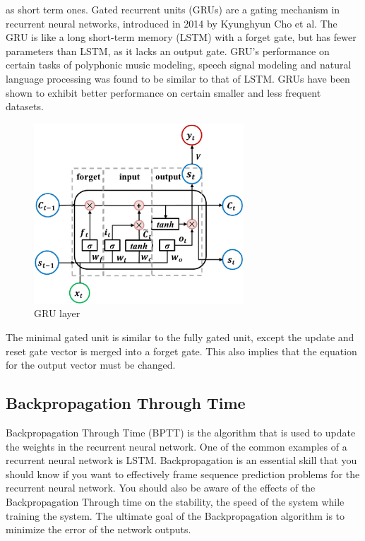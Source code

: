 as short term ones.
Gated recurrent units (GRUs) are a gating mechanism in recurrent neural networks,
introduced in 2014 by Kyunghyun Cho et al.
The GRU is like a long short-term memory (LSTM) with a forget gate, but has fewer parameters 
than LSTM, as it lacks an output gate. GRU's performance on certain tasks of polyphonic music
modeling, speech signal modeling and natural language processing was found to be similar 
to that of LSTM. GRUs have been shown to exhibit better performance on certain smaller and less
frequent datasets.
\begin{figure}[htb] 
	\label{fig:gru}
	\includegraphics[width=0.7\textwidth]{figures/gru}
	\caption{GRU layer}
\end{figure}
The minimal gated unit is similar to the fully gated unit, except the update and reset gate vector
is merged into a forget gate. This also implies that the equation for the output vector 
must be changed.

\subsection{Backpropagation Through Time}
Backpropagation Through Time (BPTT) is the algorithm that is used to update the weights in the 
recurrent neural network. 
One of the common examples of a recurrent neural network is LSTM. 
Backpropagation is an essential skill that you should know if you want to effectively frame 
sequence prediction problems for the recurrent neural network. You should also be aware of the
effects of the Backpropagation Through time on the stability, the speed of the system while 
training the system.
The ultimate goal of the Backpropagation algorithm is to minimize the error of the network outputs.


